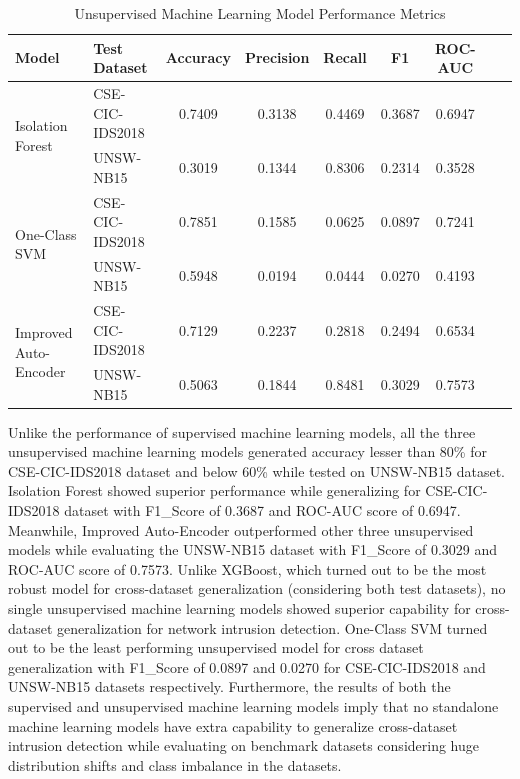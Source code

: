 \begin{table}[H]
    \centering
    \caption{Unsupervised Machine Learning Model Performance Metrics}
    \label{tab:model_performance_unsupervised}
    \scriptsize
    \setlength{\tabcolsep}{3pt}

    \begin{tabular}{llccccccc}
        \toprule
        \textbf{Model} & \textbf{Test Dataset} &
        \textbf{Accuracy} & \textbf{Precision} & \textbf{Recall} &
        \textbf{F1} & \textbf{ROC-AUC} \\
        \midrule

        \multirow[c]{2}{*}{Isolation Forest}
        & CSE-CIC-IDS2018 & 0.7409 & 0.3138 & 0.4469 & 0.3687 & 0.6947 \\ 
        & UNSW-NB15       & 0.3019 & 0.1344 & 0.8306 & 0.2314 & 0.3528  \\

        \midrule

        \multirow[c]{2}{*}{One-Class SVM}
        & CSE-CIC-IDS2018 & 0.7851 & 0.1585 & 0.0625 & 0.0897 & 0.7241 \\
        & UNSW-NB15       & 0.5948 & 0.0194 & 0.0444 & 0.0270 & 0.4193 \\

        \midrule

        \multirow[c]{2}{*}{Improved Auto-Encoder}
        & CSE-CIC-IDS2018 & 0.7129 & 0.2237 & 0.2818 & 0.2494 & 0.6534 \\
        & UNSW-NB15       & 0.5063 & 0.1844 & 0.8481 & 0.3029 & 0.7573 \\ 

        \bottomrule
    \end{tabular}
\end{table}
\FloatBarrier

Unlike the performance of supervised machine learning models, all the three unsupervised 
machine learning models generated accuracy lesser than 80\% for CSE-CIC-IDS2018 dataset 
and below 60\% while tested on UNSW-NB15 dataset. Isolation Forest showed superior performance 
while generalizing for CSE-CIC-IDS2018 dataset with F1\_Score of 0.3687 and ROC-AUC score of 
0.6947. Meanwhile, Improved Auto-Encoder outperformed other three unsupervised models while evaluating 
the UNSW-NB15 dataset with F1\_Score of 0.3029 and ROC-AUC score of 0.7573. Unlike XGBoost, which 
turned out to be the most robust model for cross-dataset generalization (considering both test datasets),
no single unsupervised machine learning models showed superior capability for cross-dataset generalization 
for network intrusion detection. One-Class SVM turned out to be the least performing unsupervised model 
for cross dataset generalization with F1\_Score of 0.0897 and 0.0270 for CSE-CIC-IDS2018 and UNSW-NB15 
datasets respectively. 
Furthermore, the results of both the supervised and unsupervised machine learning models imply that no 
standalone machine learning models have extra capability to generalize cross-dataset intrusion detection 
while evaluating on benchmark datasets considering huge distribution shifts and class imbalance in the datasets.

